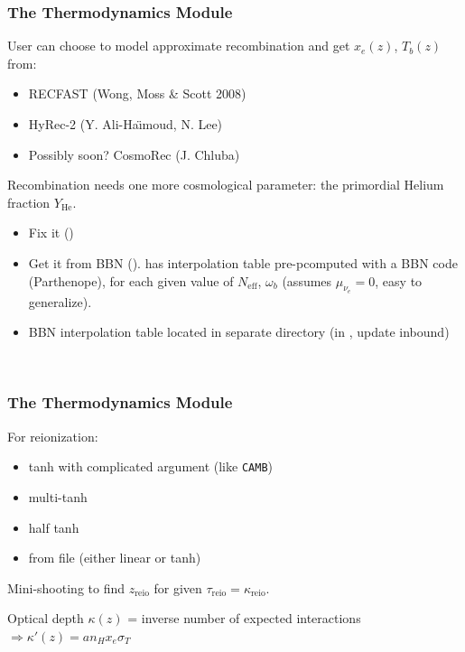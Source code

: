 \begin{frame}[fragile]
\frametitle{The Thermodynamics Module}

User can choose to model approximate recombination and get $x_e(z)$, $T_b(z)$ from:
\begin{itemize}
\item {\Purple RECFAST} (Wong, Moss \& Scott 2008)
\item {\Purple HyRec-2} (Y. Ali-Ha\"{\i}moud, N. Lee)
\item Possibly soon? {\Purple CosmoRec} (J. Chluba)
\end{itemize}

\pause
\vspace{0.2cm}

Recombination needs one more cosmological parameter: the {\Red primordial Helium fraction} $Y_\mathrm{He}$.
\begin{itemize}
\item Fix it ()
\item Get it from BBN (). {\Red \CLASS{}} has interpolation table pre-pcomputed with a {\Red BBN code} ({\Purple Parthenope}), for each given value of $N_\mathrm{eff}$, $\omega_b$ (assumes $\mu_{\nu_e}=0$, easy to generalize).
\item BBN interpolation table located in separate directory (in , update inbound)
\end{itemize}


\mbox{}\\

\end{frame}


\begin{frame}[fragile]
	\frametitle{The Thermodynamics Module}
	
	For reionization:
	\begin{itemize}
		\item tanh with complicated argument (like {\tt \Red CAMB})
		\item multi-tanh
		\item half tanh
		\item from file (either linear or tanh)
	\end{itemize}
	
	\pause 
	\vspace{0.2cm}
	Mini-shooting to find $z_\mathrm{reio}$ for given $\tau_\mathrm{reio} = \kappa_\mathrm{reio}$. 
	
	Optical depth $\kappa(z)$ = inverse number of expected interactions  $\Rightarrow \kappa'(z) = a n_H x_e \sigma_T$\\
\end{frame}



